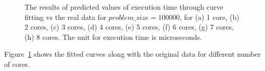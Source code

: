 \begin{figure}[H]
{	\label{fig43:h}}\hfill
	\caption{The results of predicted values of execution time through curve fitting vs the real data for $problem\_size=100000$, for (a) 1 core, (b) 2 cores, (c) 3 cores, (d) 4 cores, (e) 5 cores, (f) 6 cores, (g) 7 cores, (h) 8 cores. The unit for execution time is microseconds.}
	\label{fig43}	
\end{figure}

Figure~\ref{fig43} shows the fitted curves along with the original data for different number of cores.


\begin{figure}[H]
	\centering
	\hfill
\end{figure}
